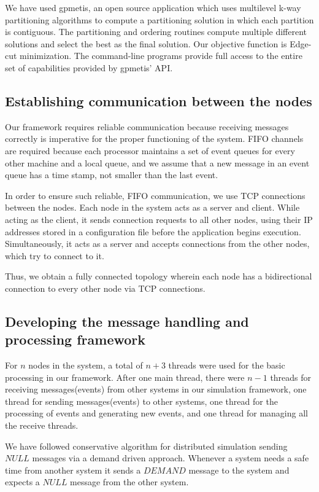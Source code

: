 \documentclass[12pt,a4paper]{article}
\begin{document}
We have used gpmetis, an open source application which uses multilevel k-way partitioning algorithms to compute a partitioning solution in which each partition is contiguous. The partitioning and ordering routines compute multiple different solutions and select the best as the final solution. Our objective function is Edge-cut minimization. The command-line programs provide full access to the entire set of capabilities provided by gpmetis' API.
	\subsection{Establishing communication between the nodes}
Our framework requires reliable communication because receiving messages correctly is imperative for the proper functioning of the system. FIFO channels are required because each processor maintains a set of event queues for every other machine and a local queue, and we assume that a new message in an event queue has a time stamp, not smaller than the last event.

In order to ensure such reliable, FIFO communication, we use TCP connections between the nodes. Each node in the system acts as a server and client. While acting as the client, it sends connection requests to all other nodes, using their IP addresses stored in a configuration file before the application begins execution. Simultaneously, it acts as a server and accepts connections from the other nodes, which try to connect to it.

Thus, we obtain a fully connected topology wherein each node has a bidirectional connection to every other node via TCP connections.
	\subsection{Developing the message handling and processing framework}
For $n$ nodes in the system, a total of $n+3$ threads were used for the basic processing in our framework. After one main thread, there were $n-1$ threads for receiving messages(events) from other systems in our simulation framework, one thread for sending messages(events) to other systems, one thread for the processing of events and generating new events, and one thread for managing all the receive threads.

We have followed conservative algorithm for distributed simulation sending $NULL$ messages via a demand driven approach. Whenever a system needs a safe time from another system it sends a $DEMAND$ message to the system and expects a $NULL$ message from the other system.
\end{document}
